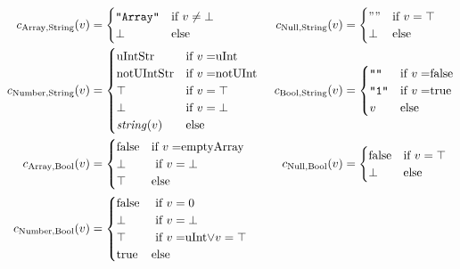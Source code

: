 {\scriptsize
\begin{align*}
c_{\text{Array},\text{String}}(v) &= \begin{cases}
\texttt{"Array"} & \text{if $v \neq \bot$}\\
\bot & \text{else}
\end{cases} & 
c_{\text{Null},\text{String}}(v) &=\begin{cases} 
       "" & \text{if $v = \top$}\\
       \bot & \text{else}
  \end{cases}\\
c_{\text{Number},\text{String}}(v) &=\begin{cases} 
       \text{uIntStr} & \text{if $v = $uInt }\\
       \text{notUIntStr} & \text{if $v = $notUInt  }\\
       \top & \text{if $v = \top$  }\\
       \bot & \text{if $v = \bot$  }\\
       \mathit{string}(v) & \text{else}\\
  \end{cases} &
c_{\text{Bool},\text{String}}(v) &=\begin{cases} 
       \texttt{""} & \text{if $v = $false}\\
       \texttt{"1"} & \text{if $v = $true}\\
       v & \text{else}
  \end{cases}\\
c_{\text{Array}, \text{Bool}}(v) &= \begin{cases} 
       \text{false} & \text{if $v = $emptyArray }\\
       \bot & \text{ if $v = \bot$}\\
       \top & \text{else}\\
  \end{cases} &
c_{\text{Null}, \text{Bool}}(v) &= \begin{cases} 
       \text{false} & \text{if $v = \top$}\\
       \bot & \text{else}
  \end{cases}\\
c_{\text{Number}, \text{Bool}}(v) &=\begin{cases} 
       \text{false} & \text{ if $v = 0$} \\
       \bot & \text{ if $v = \bot$}\\
       \top & \text{ if $v = $uInt$ \vee v = \top$}\\
       \text{true} & \text{else}

\end{cases}
\end{align*}}
